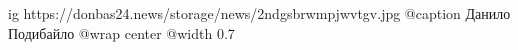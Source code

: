  
 
 
 
 

\ifcmt
  ig https://donbas24.news/storage/news/2ndgsbrwmpjwvtgv.jpg
	@caption Данило Подибайло
  @wrap center
  @width 0.7
\fi
